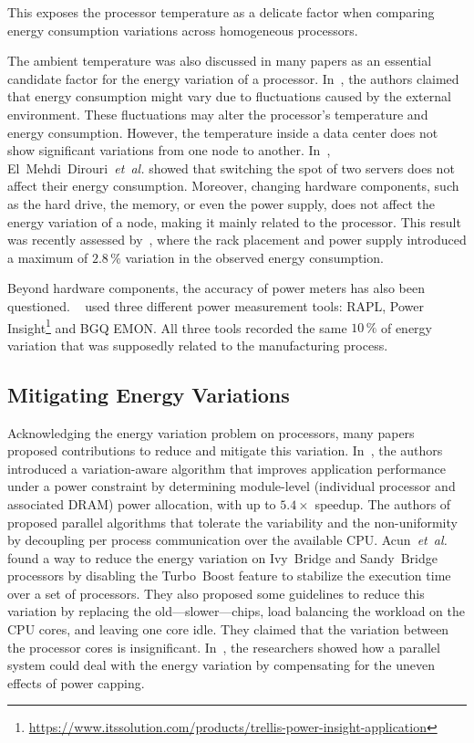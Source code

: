 This exposes the processor temperature as a delicate factor when comparing energy consumption variations across homogeneous processors.

The ambient temperature was also discussed in many papers as an essential candidate factor for the energy variation of a processor.
In~\cite{ranka_energy_2009}, the authors claimed that energy consumption might vary due to fluctuations caused by the external environment.
These fluctuations may alter the processor's temperature and energy consumption.
However, the temperature inside a data center does not show significant variations from one node to another.
In~\cite{el_mehdi_diouri_your_2013}, El~Mehdi~Dirouri~\emph{et~al.} showed that switching the spot of two servers does not affect their energy consumption.
Moreover, changing hardware components, such as the hard drive, the memory, or even the power supply, does not affect the energy variation of a node, making it mainly related to the processor.
This result was recently assessed by~\cite{wang_potential_2018}, where the rack placement and power supply introduced a maximum of $2.8\,\%$ variation in the observed energy consumption.

Beyond hardware components, the accuracy of power meters has also been questioned.
\citeauthor{inadomi_analyzing_2015}~\cite{inadomi_analyzing_2015} used three different power measurement tools: RAPL, Power Insight\footnote{\url{https://www.itssolution.com/products/trellis-power-insight-application}} and BGQ EMON.
All three tools recorded the same $10\,\%$ of energy variation that was supposedly related to the manufacturing process.

\subsection{Mitigating Energy Variations}
Acknowledging the energy variation problem on processors, many papers proposed contributions to reduce and mitigate this variation.
In~\cite{inadomi_analyzing_2015}, the authors introduced a variation-aware algorithm that improves application performance under a power constraint by determining module-level (individual processor and associated DRAM) power allocation, with up to $5.4\times$ speedup.
The authors of~\cite{hammouda_noise-tolerant_2015} proposed parallel algorithms that tolerate the variability and the non-uniformity by decoupling per process communication over the available CPU.
Acun~\emph{et~al.}~\cite{acun_variation_2016} found a way to reduce the energy variation on Ivy~Bridge and Sandy~Bridge processors by disabling the Turbo~Boost feature to stabilize the execution time over a set of processors.
They also proposed some guidelines to reduce this variation by replacing the old---slower---chips, load balancing the workload on the CPU cores, and leaving one core idle.
They claimed that the variation between the processor cores is insignificant.
In~\cite{chasapis_runtime-guided_2016}, the researchers showed how a parallel system could deal with the energy variation by compensating for the uneven effects of power capping.

